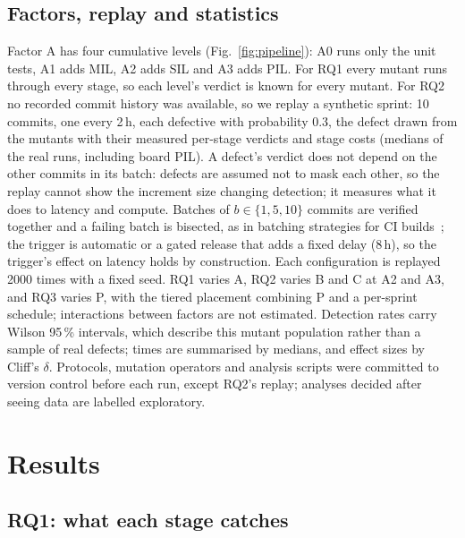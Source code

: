 \documentclass[conference]{IEEEtran}
\begin{document}
\subsection{Factors, replay and statistics}
Factor A has four cumulative levels (Fig.~\ref{fig:pipeline}): A0 runs only the unit tests, A1 adds MIL, A2
adds SIL and A3 adds PIL. For RQ1 every mutant runs through every stage, so each level's verdict is known for
every mutant. For RQ2 no recorded commit history was
available, so we replay a synthetic sprint: 10 commits, one every 2\,h, each defective with probability 0.3,
the defect drawn from the mutants with their measured per-stage verdicts and stage costs (medians of
the real runs, including board PIL). A defect's verdict does not depend on the other commits in its batch:
defects are assumed not to mask each other, so the replay cannot show the increment size changing detection;
it measures what it does to latency and compute. Batches of $b\in\{1,5,10\}$ commits are verified together
and a failing batch is bisected, as in batching strategies for CI builds~\cite{beheshtian2022}; the trigger
is automatic or a gated release that adds a fixed delay (8\,h), so the trigger's effect on latency holds by
construction. Each configuration is replayed 2000 times with a fixed seed. RQ1 varies A, RQ2 varies B and C
at A2 and A3, and RQ3 varies P, with the tiered placement combining P and a per-sprint schedule; interactions
between factors are not estimated. Detection rates carry Wilson
95\,\% intervals, which describe this mutant population rather than a sample of real defects; times are summarised by
medians, and effect sizes by Cliff's $\delta$. Protocols, mutation operators and analysis scripts were
committed to version control before each run, except RQ2's replay; analyses decided after seeing data are
labelled exploratory.

\section{Results}

\subsection{RQ1: what each stage catches}\label{sec:rq1}
\end{document}
